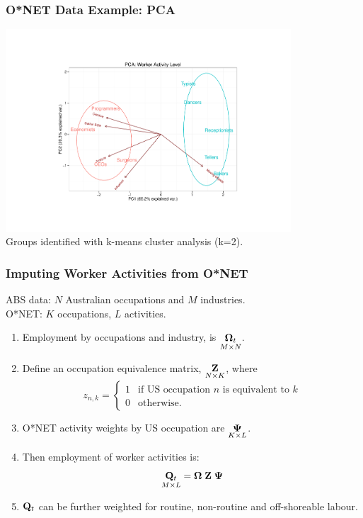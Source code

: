 \documentclass[red]{beamer}
\begin{document}
\begin{frame}
  \frametitle{O*NET Data Example: PCA}
  \begin{center}
  \includegraphics[width=0.8\textwidth]{slides_fig/pca_example.pdf} \\
  Groups identified with k-means cluster analysis (k=2).
  \end{center}
\end{frame}

\begin{frame}
  \frametitle{Imputing Worker Activities from O*NET}
ABS data: $N$ Australian occupations and $M$ industries.\\
O*NET: $K$ occupations, $L$ activities.
  \begin{enumerate}
  \item Employment by occupations and industry, is 
    $\underset{M\times N}{{\bf \Omega}_t}$.
  \item Define an occupation equivalence matrix, $\underset{N\times K}{\bf Z}$, where \vspace{-10pt}   \[
    z_{n,k} = \left\{ 
      \begin{array}{ll}1 &\text{if US occupation $n$ is equivalent to $k$}\\
      0 & \text{otherwise.}\end{array}\right.
    \]
  \item O*NET activity weights by US occupation are $\underset{K\times L}{\bf \Psi}$.
  \item Then employment of worker activities is:
    $$ \underset{M\times L}{{\bf Q}_t} = {\bf \Omega\; Z\; \Psi} $$
  \item ${{\bf Q}_t}$ can be further weighted for routine, non-routine and off-shoreable labour.
  \end{enumerate}
\end{frame}
\end{document}
